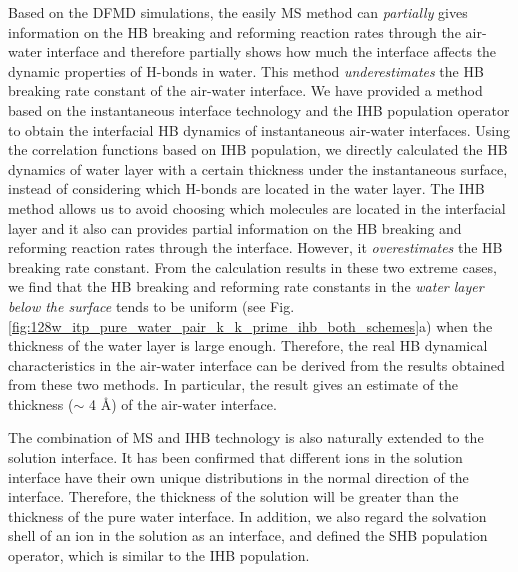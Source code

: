 Based on the DFMD simulations, the easily MS method %
can \emph{partially} gives information on the HB breaking and reforming reaction
rates through the air-water interface and therefore partially shows how much the interface affects the dynamic properties of H-bonds in water. 
This method \emph{underestimates} the HB breaking rate constant of the air-water interface. 
We have provided a method based on the instantaneous interface technology and the
IHB population operator to obtain the interfacial HB dynamics of instantaneous air-water interfaces.  
Using the correlation functions based on IHB population, we directly calculated the HB dynamics of water layer with a certain thickness 
under the instantaneous surface, instead of considering which H-bonds are located in the water layer. 
The IHB method allows us to avoid choosing which molecules are located in the interfacial layer and
it also can provides partial information on the HB breaking and reforming reaction rates through the interface. 
However, it \emph{overestimates} the HB breaking rate constant. From the calculation results in these two extreme cases, 
we find that the HB breaking and reforming rate constants in the \emph{water layer below the surface} tends to be uniform 
(see Fig.\ref{fig:128w_itp_pure_water_pair_k_k_prime_ihb_both_schemes}a) 
when the thickness of the water layer is large enough. Therefore, the real HB dynamical characteristics in the air-water interface 
can be derived from the results obtained from these two methods. 
In particular, the result gives an estimate of the thickness ($\sim$ 4 \AA) of the air-water interface.

The combination of MS and IHB technology is also naturally extended to the solution interface. 
It has been confirmed that different ions in the solution interface have their own unique distributions in the normal direction of the interface. 
Therefore, the thickness of the solution will be greater than the thickness of the pure water interface. 
In addition, we also regard the solvation shell of an ion in the solution as an interface, 
and defined the SHB population operator, which is similar to the IHB population.

